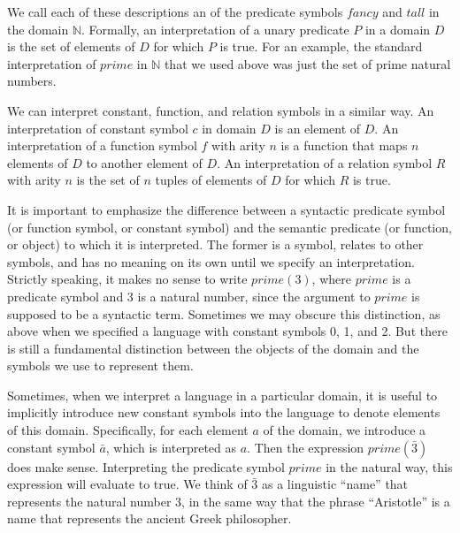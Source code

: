 \documentclass[letterpaper,10pt,english]{sphinxmanual}
\begin{document}
\sphinxAtStartPar
We call each of these descriptions an  of the predicate symbols \(\mathit{fancy}\) and \(\mathit{tall}\) in the domain \({\mathbb N}\). Formally, an interpretation of a unary predicate \(P\) in a domain \(D\) is the set of elements of \(D\) for which \(P\) is true. For an example, the standard interpretation of \(\mathit{prime}\) in \({\mathbb N}\) that we used above was just the set of prime natural numbers.

\sphinxAtStartPar
We can interpret constant, function, and relation symbols in a similar way. An interpretation of constant symbol \(c\) in domain \(D\) is an element of \(D\). An interpretation of a function symbol \(f\) with arity \(n\) is a function that maps \(n\) elements of \(D\) to another element of \(D\). An interpretation of a relation symbol \(R\) with arity \(n\) is the set of \(n\) tuples of elements of \(D\) for which \(R\) is true.

\sphinxAtStartPar
It is important to emphasize the difference between a syntactic predicate symbol (or function symbol, or constant symbol) and the semantic predicate (or function, or object) to which it is interpreted. The former is a symbol, relates to other symbols, and has no meaning on its own until we specify an interpretation. Strictly speaking, it makes no sense to write \(\mathit{prime}(3)\), where \(\mathit{prime}\) is a predicate symbol and 3 is a natural number, since the argument to \(\mathit{prime}\) is supposed to be a syntactic term. Sometimes we may obscure this distinction, as above when we specified a language with constant symbols 0, 1, and 2. But there is still a fundamental distinction between the objects of the domain and the symbols we use to represent them.

\sphinxAtStartPar
Sometimes, when we interpret a language in a particular domain, it is useful to implicitly introduce new constant symbols into the language to denote elements of this domain. Specifically, for each element \(a\) of the domain, we introduce a constant symbol \(\bar a\), which is interpreted as \(a\). Then the expression \(\mathit{prime}(\bar 3)\) does make sense. Interpreting the predicate symbol \(\mathit{prime}\) in the natural way, this expression will evaluate to true. We think of \(\bar 3\) as a linguistic “name” that represents the natural number 3, in the same way that the phrase “Aristotle” is a name that represents the ancient Greek philosopher.
\end{document}
